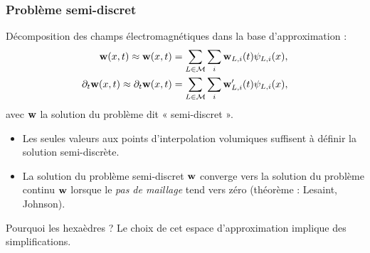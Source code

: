 \begin{frame}
\frametitle{Problème semi-discret}
\vfill
Décomposition des champs électromagnétiques dans la base d'approximation :
\begin{align*}
	\W(\x,t) \approx \Wd(\x,t) &= \sum_{\L \in \Mesh} \sum_{i}
		\Wd_{\L,i}(t) \PsiPhy{\L}{i}(\x) ,
	\\
	\Ptl{t}\W(\x,t) \approx \Ptl{t}\Wd(\x,t) &= \sum_{\L \in \Mesh} \sum_{i}
		\Wd'_{\L,i}(t) \PsiPhy{\L}{i}(\x) ,
\end{align*}
avec $\bm{\mathrm{w}}$ la solution du problème dit « semi-discret ».
\vfill
\begin{itemize}
\item Les seules valeurs aux points d'interpolation volumiques suffisent à définir la solution semi-discrète.
\item La solution du problème semi-discret $\bm{\mathrm{w}}$
converge vers la solution du problème continu $\W$
lorsque le \textit{pas de maillage} tend vers zéro (théorème : Lesaint, Johnson).
\end{itemize}
\vfill
Pourquoi les hexaèdres ? Le choix de cet espace d'approximation implique des simplifications.
\vfill
\end{frame}
\renewcommand{\W}{\Vec{\mathrm{w}}} %

